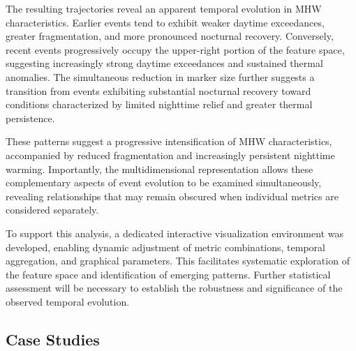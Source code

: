 The resulting trajectories reveal an apparent temporal evolution in MHW characteristics. Earlier events tend to exhibit weaker daytime exceedances, greater fragmentation, and more pronounced nocturnal recovery. Conversely, recent events progressively occupy the upper-right portion of the feature space, suggesting increasingly strong daytime exceedances and sustained thermal anomalies. The simultaneous reduction in marker size further suggests a transition from events exhibiting substantial nocturnal recovery toward conditions characterized by limited nighttime relief and greater thermal persistence.

These patterns suggest a progressive intensification of MHW characteristics, accompanied by reduced fragmentation and increasingly persistent nighttime warming. Importantly, the multidimensional representation allows these complementary aspects of event evolution to be examined simultaneously, revealing relationships that may remain obscured when individual metrics are considered separately.

To support this analysis, a dedicated interactive visualization environment was developed, enabling dynamic adjustment of metric combinations, temporal aggregation, and graphical parameters. This facilitates systematic exploration of the feature space and identification of emerging patterns. Further statistical assessment will be necessary to establish the robustness and significance of the observed temporal evolution.


\noindent
\begin{figure}[h!]
    \centering   
    
\end{figure}


\clearpage
\subsection{Case Studies}


